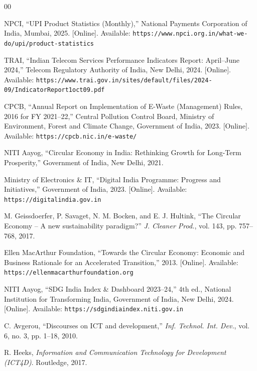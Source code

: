 \documentclass[conference]{IEEEtran}
\begin{document}
\balance
\begin{thebibliography}{00}

NPCI, ``UPI Product Statistics (Monthly),'' National Payments Corporation of India, Mumbai, 2025. [Online]. Available: \nolinkurl{https://www.npci.org.in/what-we-do/upi/product-statistics}

TRAI, ``Indian Telecom Services Performance Indicators Report: April--June 2024,'' Telecom Regulatory Authority of India, New Delhi, 2024. [Online]. Available: \nolinkurl{https://www.trai.gov.in/sites/default/files/2024-09/IndicatorReport1oct09.pdf}

CPCB, ``Annual Report on Implementation of E-Waste (Management) Rules, 2016 for FY 2021--22,'' Central Pollution Control Board, Ministry of Environment, Forest and Climate Change, Government of India, 2023. [Online]. Available: \nolinkurl{https://cpcb.nic.in/e-waste/}

NITI Aayog, ``Circular Economy in India: Rethinking Growth for Long-Term Prosperity,'' Government of India, New Delhi, 2021.

Ministry of Electronics \& IT, ``Digital India Programme: Progress and Initiatives,'' Government of India, 2023. [Online]. Available: \nolinkurl{https://digitalindia.gov.in}

M. Geissdoerfer, P. Savaget, N. M. Bocken, and E. J. Hultink, ``The Circular Economy -- A new sustainability paradigm?'' \textit{J. Cleaner Prod.}, vol. 143, pp. 757--768, 2017.

Ellen MacArthur Foundation, ``Towards the Circular Economy: Economic and Business Rationale for an Accelerated Transition,'' 2013. [Online]. Available: \nolinkurl{https://ellenmacarthurfoundation.org}

NITI Aayog, ``SDG India Index \& Dashboard 2023--24,'' 4th ed., National Institution for Transforming India, Government of India, New Delhi, 2024. [Online]. Available: \nolinkurl{https://sdgindiaindex.niti.gov.in}

C. Avgerou, ``Discourses on ICT and development,'' \textit{Inf. Technol. Int. Dev.}, vol. 6, no. 3, pp. 1--18, 2010.

R. Heeks, \textit{Information and Communication Technology for Development (ICT4D)}. Routledge, 2017.


\end{thebibliography}
\end{document}
